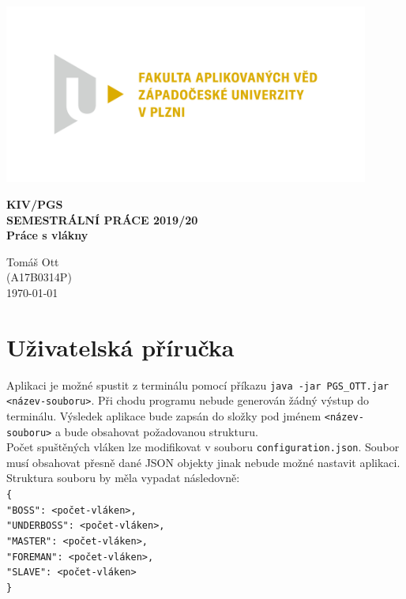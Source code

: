 \documentclass[ 12pt, a4paper]{article}
\begin{document}
\def\code#1{\texttt{#1}}

%
\centerline{\includegraphics[width=12cm]{logo.png}}
\vspace*{50px}
\begin{center}
	{\LARGE\bf\noindent KIV/PGS \\ SEMESTRÁLNÍ PRÁCE 2019/20\\ Práce s vlákny}\\
	\vspace*{40px}  
	
	Tomáš Ott\\
	(A17B0314P)\\
	\vspace*{\fill}  
	\hspace*{\fill} \today \\
\end{center}
\newpage
\tableofcontents
\newpage

\section{Uživatelská příručka}
Aplikaci je možné spustit z terminálu pomocí příkazu \texttt{java -jar PGS\_OTT.jar <název-souboru>}. Při chodu programu nebude generován žádný výstup do terminálu. Výsledek aplikace bude zapsán do složky pod jménem \texttt{<název-souboru>} a bude obsahovat požadovanou strukturu. \\

Počet spuštěných vláken lze modifikovat v souboru \texttt{configuration.json}. Soubor musí obsahovat přesně dané JSON objekty jinak nebude možné nastavit aplikaci. Struktura souboru by měla vypadat následovně: \\
\texttt{\{\\
	"BOSS": <počet-vláken>,\\
	"UNDERBOSS": <počet-vláken>,\\
	"MASTER": <počet-vláken>,\\
	"FOREMAN": <počet-vláken>,\\
	"SLAVE": <počet-vláken>\\
\}} 
\end{document}
